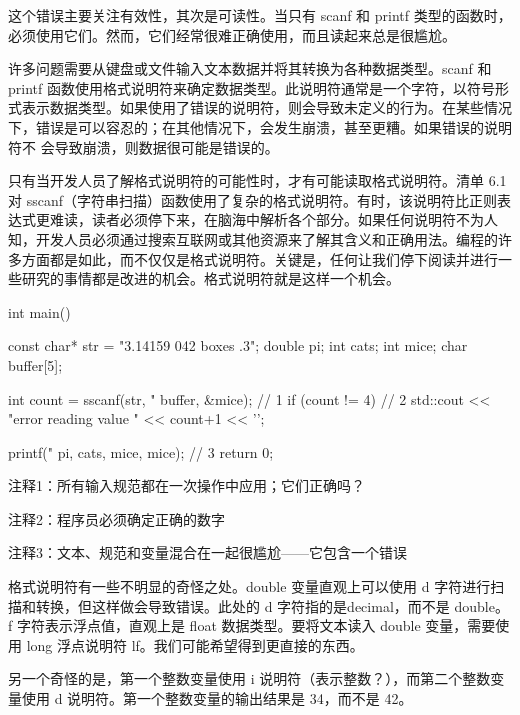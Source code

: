 这个错误主要关注有效性，其次是可读性。当只有 scanf 和 printf 类型的函数时，必须使用它们。然而，它们经常很难正确使用，而且读起来总是很尴尬。


许多问题需要从键盘或文件输入文本数据并将其转换为各种数据类型。scanf 和 printf 函数使用格式说明符来确定数据类型。此说明符通常是一个字符，以符号形式表示数据类型。如果使用了错误的说明符，则会导致未定义的行为。在某些情况下，错误是可以容忍的；在其他情况下，会发生崩溃，甚至更糟。如果错误的说明符不 会导致崩溃，则数据很可能是错误的。

只有当开发人员了解格式说明符的可能性时，才有可能读取格式说明符。清单 6.1 对 sscanf（字符串扫描）函数使用了复杂的格式说明符。有时，该说明符比正则表达式更难读，读者必须停下来，在脑海中解析各个部分。如果任何说明符不为人知，开发人员必须通过搜索互联网或其他资源来了解其含义和正确用法。编程的许多方面都是如此，而不仅仅是格式说明符。关键是，任何让我们停下阅读并进行一些研究的事情都是改进的机会。格式说明符就是这样一个机会。


\begin{cpp}
int main() {
  const char* str = "3.14159 042 boxes .3";
  double pi;
  int cats;
  int mice;
  char buffer[5];

  int count = sscanf(str, "%
    buffer, &mice); // 1
  if (count != 4) // 2
    std::cout << "error reading value " << count+1 << '\n';

  printf("%
    pi, cats, mice, mice); // 3
  return 0;
}
\end{cpp}

{\footnotesize
注释1：所有输入规范都在一次操作中应用；它们正确吗？

注释2：程序员必须确定正确的数字

注释3：文本、规范和变量混合在一起很尴尬——它包含一个错误
}


格式说明符有一些不明显的奇怪之处。double 变量直观上可以使用 d 字符进行扫描和转换，但这样做会导致错误。此处的 d 字符指的是decimal，而不是 double。f 字符表示浮点值，直观上是 float 数据类型。要将文本读入 double 变量，需要使用 long 浮点说明符 lf。我们可能希望得到更直接的东西。

另一个奇怪的是，第一个整数变量使用 i 说明符（表示整数？），而第二个整数变量使用 d 说明符。第一个整数变量的输出结果是 34，而不是 42。

